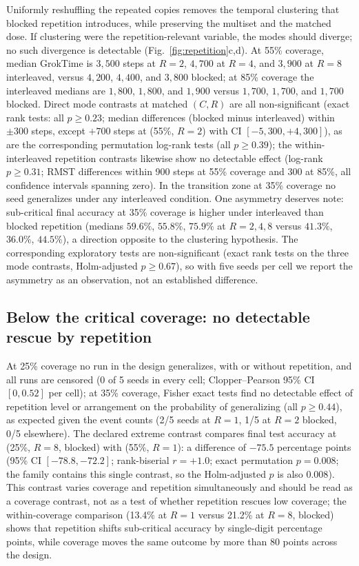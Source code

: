 \documentclass[10pt]{article}
\newcommand{\coverage}{C}
\newcommand{\repetition}{R}
\newcommand{\groktime}{GrokTime}
\begin{document}
Uniformly reshuffling the repeated copies removes the temporal clustering that blocked repetition introduces, while preserving the multiset and the matched dose. If clustering were the repetition-relevant variable, the modes should diverge; no such divergence is detectable (Fig.~\ref{fig:repetition}c,d). At 55\% coverage, median \groktime{} is $3{,}500$ steps at $R=2$, $4{,}700$ at $R=4$, and $3{,}900$ at $R=8$ interleaved, versus $4{,}200$, $4{,}400$, and $3{,}800$ blocked; at 85\% coverage the interleaved medians are $1{,}800$, $1{,}800$, and $1{,}900$ versus $1{,}700$, $1{,}700$, and $1{,}700$ blocked. Direct mode contrasts at matched $(\coverage, \repetition)$ are all non-significant (exact rank tests: all $p \geq 0.23$; median differences (blocked minus interleaved) within $\pm300$ steps, except $+700$ steps at (55\%, $R=2$) with CI $[-5{,}300, +4{,}300]$), as are the corresponding permutation log-rank tests (all $p \geq 0.39$); the within-interleaved repetition contrasts likewise show no detectable effect (log-rank $p \geq 0.31$; RMST differences within 900 steps at 55\% coverage and 300 at 85\%, all confidence intervals spanning zero). In the transition zone at 35\% coverage no seed generalizes under any interleaved condition. One asymmetry deserves note: sub-critical final accuracy at 35\% coverage is higher under interleaved than blocked repetition (medians $59.6\%$, $55.8\%$, $75.9\%$ at $R=2,4,8$ versus $41.3\%$, $36.0\%$, $44.5\%$), a direction opposite to the clustering hypothesis. The corresponding exploratory tests are non-significant (exact rank tests on the three mode contrasts, Holm-adjusted $p \geq 0.67$), so with five seeds per cell we report the asymmetry as an observation, not an established difference.

\subsection{Below the critical coverage: no detectable rescue by repetition}
\label{sec:below}

At 25\% coverage no run in the design generalizes, with or without repetition, and all runs are censored (0 of 5 seeds in every cell; Clopper--Pearson 95\% CI $[0, 0.52]$ per cell); at 35\% coverage, Fisher exact tests find no detectable effect of repetition level or arrangement on the probability of generalizing (all $p \geq 0.44$), as expected given the event counts (2/5 seeds at $R=1$, 1/5 at $R=2$ blocked, 0/5 elsewhere). The declared extreme contrast compares final test accuracy at (25\%, $R=8$, blocked) with (55\%, $R=1$): a difference of $-75.5$ percentage points (95\% CI $[-78.8, -72.2]$; rank-biserial $r=+1.0$; exact permutation $p=0.008$; the family contains this single contrast, so the Holm-adjusted $p$ is also $0.008$). This contrast varies coverage and repetition simultaneously and should be read as a coverage contrast, not as a test of whether repetition rescues low coverage; the within-coverage comparison (13.4\% at $R=1$ versus 21.2\% at $R=8$, blocked) shows that repetition shifts sub-critical accuracy by single-digit percentage points, while coverage moves the same outcome by more than 80 points across the design.
\end{document}
